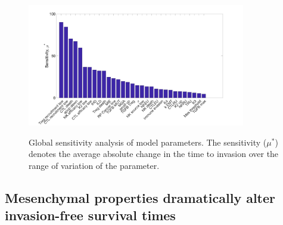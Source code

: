 \documentclass[11pt]{article}
\begin{document}



\begin{figure}
\center
{\includegraphics[width=0.85\textwidth]{Figure2/MOAT.jpg}}
\caption{Global sensitivity analysis of model parameters. The sensitivity ($\mu^*$) denotes the average absolute change in the time to invasion over the range of variation of the parameter.}
\label{fig:MOAT}
\end{figure}

\subsection{Mesenchymal properties dramatically alter invasion-free survival times}\label{MesPars}
\end{document}
